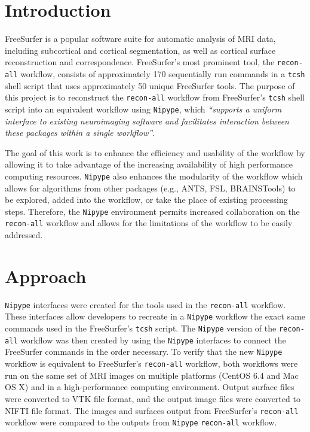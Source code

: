 \documentclass[twocolumn]{bmcart}%
\begin{document}

\section{Introduction}\label{introduction}

FreeSurfer\cite{Fischl2012} is a popular software suite for automatic analysis of MRI data, including subcortical and cortical segmentation, as well as cortical surface reconstruction and correspondence.
FreeSurfer's most prominent tool, the \texttt{recon-all} workflow, consists of approximately 170 sequentially run commands in a \texttt{tcsh} shell script that uses approximately 50 unique FreeSurfer tools.
The purpose of this project is to reconstruct the  \texttt{recon-all} workflow from FreeSurfer's \texttt{tcsh} shell script into an equivalent workflow using \texttt{Nipype}, which \textit{``supports a uniform interface to existing neuroimaging software and facilitates interaction between these packages within a single workflow''}\cite{Gorgolewski2011}. 

The goal of this work is to enhance the efficiency and usability of the workflow by allowing it to take advantage of the increasing availability of high performance computing resources.
\texttt{Nipype} also enhances the modularity of the workflow which allows for algorithms from other packages (e.g., ANTS\cite{Avants2009}, FSL\cite{Woolrich2009}, BRAINSTools\cite{YoungKim2013}\cite{Kim2014}\cite{Kim2015}) to be explored, added into the workflow, or take the place of existing processing steps.
Therefore, the \texttt{Nipype} environment permits increased collaboration on the \texttt{recon-all} workflow and allows for the limitations of the workflow to be easily addressed.


\section{Approach}\label{approach}
\texttt{Nipype} interfaces were created for the tools used in the \texttt{recon-all} workflow. 
These interfaces allow developers to recreate in a  \texttt{Nipype} workflow the exact same commands used in the FreeSurfer's \texttt{tcsh} script. 
The \texttt{Nipype} version of the \texttt{recon-all} workflow was then created by using the \texttt{Nipype} interfaces to connect the FreeSurfer commands in the order necessary. 
To verify that the new \texttt{Nipype} workflow is equivalent to FreeSurfer's \texttt{recon-all} workflow, both workflows were run on the same set of MRI images on multiple platforms (CentOS 6.4 and Mac OS X) and in a high-performance computing environment. 
Output surface files were converted to VTK file format, and the output image files were converted to NIFTI file format.
The images and surfaces output from FreeSurfer's \texttt{recon-all} workflow were compared to the outputs from  \texttt{Nipype} \texttt{recon-all} workflow.
\end{document}
